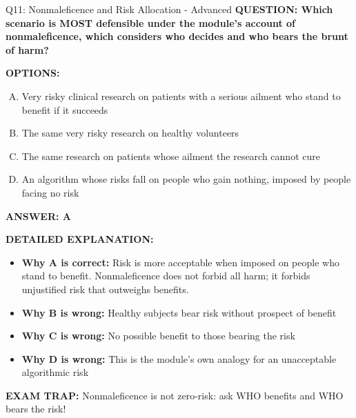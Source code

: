 \documentclass[8pt]{beamer}
\begin{document}
\begin{frame}[shrink=6]{Q11: Nonmaleficence and Risk Allocation - Advanced}
\fontsize{6.5}{7.5}\selectfont
\textbf{QUESTION: Which scenario is MOST defensible under the module's account of nonmaleficence, which considers who decides and who bears the brunt of harm?}

\vspace{0.1cm}
\textbf{OPTIONS:}
\begin{enumerate}[A.]
\item Very risky clinical research on patients with a serious ailment who stand to benefit if it succeeds
\item The same very risky research on healthy volunteers
\item The same research on patients whose ailment the research cannot cure
\item An algorithm whose risks fall on people who gain nothing, imposed by people facing no risk
\end{enumerate}

\vspace{0.1cm}
\textcolor{myblue}{\textbf{ANSWER: A}}

\vspace{0.1cm}
\textbf{DETAILED EXPLANATION:}
\begin{itemize}
\item \textbf{Why A is correct:} Risk is more acceptable when imposed on people who stand to benefit. Nonmaleficence does not forbid all harm; it forbids unjustified risk that outweighs benefits.
\item \textbf{Why B is wrong:} Healthy subjects bear risk without prospect of benefit
\item \textbf{Why C is wrong:} No possible benefit to those bearing the risk
\item \textbf{Why D is wrong:} This is the module's own analogy for an unacceptable algorithmic risk
\end{itemize}

\textcolor{myred}{\textbf{EXAM TRAP:}} Nonmaleficence is not zero-risk: ask WHO benefits and WHO bears the risk!
\end{frame}
\end{document}
